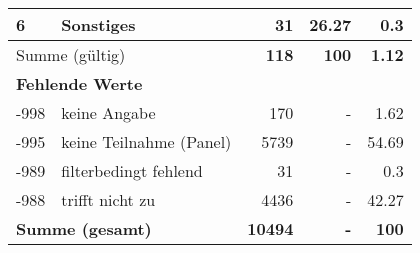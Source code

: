 \begin{longtable}{lXrrr}
     6 &
     \multicolumn{1}{X}{ Sonstiges   } &


       \num{31} &
       \num[round-mode=places,round-precision=2]{26,27} &
         \num[round-mode=places,round-precision=2]{0,3} \\
     \midrule
     \multicolumn{2}{l}{Summe (gültig)} &
       \textbf{\num{118}} &
     \textbf{100} &
       \textbf{\num[round-mode=places,round-precision=2]{1,12}} \\
     \multicolumn{5}{l}{\textbf{Fehlende Werte}}\\
       -998 &
       keine Angabe &
         \num{170} &
        - &
         \num[round-mode=places,round-precision=2]{1,62} \\
       -995 &
       keine Teilnahme (Panel) &
         \num{5739} &
        - &
         \num[round-mode=places,round-precision=2]{54,69} \\
       -989 &
       filterbedingt fehlend &
         \num{31} &
        - &
         \num[round-mode=places,round-precision=2]{0,3} \\
       -988 &
       trifft nicht zu &
         \num{4436} &
        - &
         \num[round-mode=places,round-precision=2]{42,27} \\
     \midrule
     \multicolumn{2}{l}{\textbf{Summe (gesamt)}} &
          \textbf{\num{10494}} &
        \textbf{-} &
        \textbf{100} \\
     \bottomrule
     \end{longtable}
     

